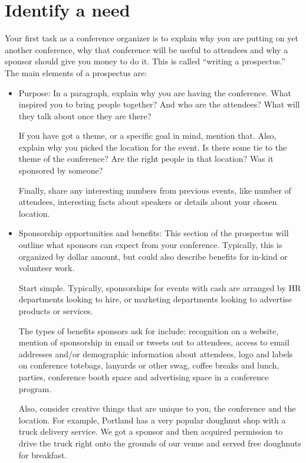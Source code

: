\section*{Identify a need}

Your first task as a conference organizer is to explain why you are putting on
yet another conference, why that conference will be useful to attendees and why
a sponsor should give you money to do it. This is called ``writing a
prospectus.''
The main elements of a prospectus are: 

\begin{itemize}
\item Purpose:
In a paragraph, explain why you are having the conference. What inspired you to
bring people together? And who are the attendees? What will they talk about once
they are there? 

If you have got a theme, or a specific goal in mind, mention that. Also, explain
why you picked the location for the event. Is there some tie to the theme of the
conference? Are the right people in that location? Was it sponsored by someone?

Finally, share any interesting numbers from previous events, like number of
attendees, interesting facts about speakers or details about your chosen
location. 

\item Sponsorship opportunities and benefits:
This section of the prospectus will outline what sponsors can expect from your
conference. Typically, this is organized by dollar amount, but could also
describe benefits for in-kind or volunteer work.

Start simple. Typically, sponsorships for events with cash are arranged by HR
departments looking to hire, or marketing departments looking to advertise
products or services. 

The types of benefits sponsors ask for include: recognition on a website,
mention of sponsorship in email or tweets out to attendees, access to email
addresses and/or demographic information about attendees, logo and labels on
conference totebags, lanyards or other swag, coffee breaks and lunch, parties,
conference booth space and advertising space in a conference program. 

Also, consider creative things that are unique to you, the conference and the
location. For example, Portland has a very popular doughnut shop with a truck
delivery service. We got a sponsor and then acquired permission to drive the
truck right onto the grounds of our venue and served free doughnuts for
breakfast.


\end{itemize}
